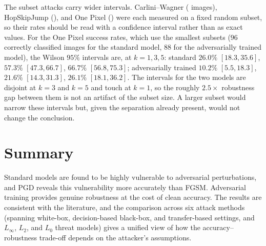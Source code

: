 The subset attacks carry wider intervals. Carlini--Wagner (\CWN{} images), HopSkipJump (\HSJN{}), and One Pixel (\OPN{}) were each measured on a fixed random subset, so their rates should be read with a confidence interval rather than as exact values. For the One Pixel success rates, which use the smallest subsets ($96$ correctly classified images for the standard model, $88$ for the adversarially trained model), the Wilson $95\%$ intervals are, at $k = 1, 3, 5$: standard $26.0\%$ $[18.3, 35.6]$, $57.3\%$ $[47.3, 66.7]$, $66.7\%$ $[56.8, 75.3]$; adversarially trained $10.2\%$ $[5.5, 18.3]$, $21.6\%$ $[14.3, 31.3]$, $26.1\%$ $[18.1, 36.2]$. The intervals for the two models are disjoint at $k = 3$ and $k = 5$ and touch at $k = 1$, so the roughly $2.5\times$ robustness gap between them is not an artifact of the subset size. A larger subset would narrow these intervals but, given the separation already present, would not change the conclusion.

\section{Summary}

Standard models are found to be highly vulnerable to adversarial perturbations, and PGD reveals this vulnerability more accurately than FGSM. Adversarial training provides genuine robustness at the cost of clean accuracy. The results are consistent with the literature, and the comparison across six attack methods (spanning white-box, decision-based black-box, and transfer-based settings, and $L_\infty$, $L_2$, and $L_0$ threat models) gives a unified view of how the accuracy--robustness trade-off depends on the attacker's assumptions.

